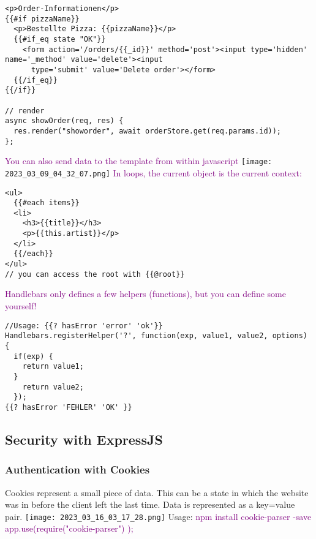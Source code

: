\documentclass[main.tex,fontsize=8pt,paper=a4,paper=portrait,DIV=calc,]{scrartcl}
\begin{document}
\begin{lstlisting}
<p>Order-Informationen</p>
{{#if pizzaName}}
  <p>Bestellte Pizza: {{pizzaName}}</p>
  {{#if_eq state "OK"}}
    <form action='/orders/{{_id}}' method='post'><input type='hidden' name='_method' value='delete'><input
      type='submit' value='Delete order'></form>
  {{/if_eq}}
{{/if}}

// render 
async showOrder(req, res) {
  res.render("showorder", await orderStore.get(req.params.id));
};
\end{lstlisting}
\textcolor{purple}{You can also send data to the template from within javascript}\newline
\texttt{[image: 2023\_03\_09\_04\_32\_07.png]}\newline
\textcolor{purple}{In loops, the current object is the current context:}\newline
\begin{lstlisting}
<ul>
  {{#each items}}
  <li>
    <h3>{{title}}</h3>
    <p>{{this.artist}}</p>
  </li>
  {{/each}}
</ul>
// you can access the root with {{@root}}
\end{lstlisting}

\textcolor{purple}{Handlebars only defines a few helpers (functions), but you can define some yourself!}
\begin{lstlisting}
//Usage: {{? hasError 'error' 'ok'}}
Handlebars.registerHelper('?', function(exp, value1, value2, options) {
  if(exp) {
    return value1;
  }
    return value2;
  });
{{? hasError 'FEHLER' 'OK' }}
\end{lstlisting}

\subsection{Security with ExpressJS}
\subsubsection{Authentication with Cookies}
Cookies represent a small piece of data. This can be a state in which the website was in before the client left the last time.\newline
Data is represented as a key=value pair.\newline
\texttt{[image: 2023\_03\_16\_03\_17\_28.png]}\newline
Usage: \newline
\textcolor{purple}{npm install cookie-parser -save \newline
app.use(require("cookie-parser"){} );}
\end{document}

